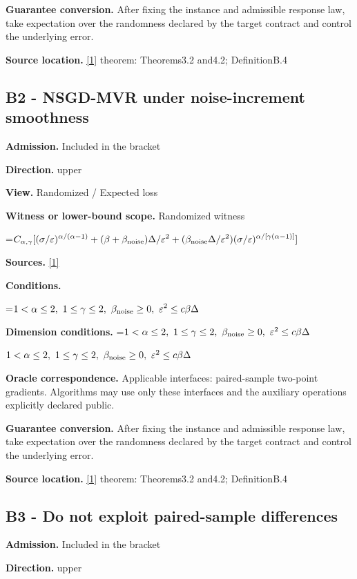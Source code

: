 \documentclass[10pt,a4paper]{article}
\newcommand{\AtlasMath}[1]{\par\begingroup\centering\setbox0=\hbox{$\displaystyle #1$}\ifdim\wd0>1.4\linewidth\typeout{ATLAS WIDE FORMULA: \the\wd0}\fi\ifdim\wd0>\linewidth\resizebox{\linewidth}{!}{\box0}\else\box0\fi\par\endgroup}
\newcommand{\AtlasInlineMath}[1]{\begingroup\setbox0=\hbox{$#1$}\ifdim\wd0>.4\linewidth\endgroup\AtlasMath{#1}\else\endgroup$#1$\fi}
\begin{document}
\textbf{Guarantee conversion.} After fixing the instance and admissible response law, take expectation over the randomness declared by the target contract and control the underlying error.

\textbf{Source location.} \href{https://arxiv.org/pdf/2512.18713}{[1]} theorem: Theorems3.2 and4.2; DefinitionB.4

\subsection{B2 - NSGD-MVR under noise-increment smoothness}
\textbf{Admission.} Included in the bracket

\textbf{Direction.} upper

\textbf{View.} Randomized / Expected loss

\textbf{Witness or lower-bound scope.} Randomized witness

\AtlasMath{C_{\alpha,\gamma}[(\sigma/\varepsilon)^{\alpha/(\alpha-1)}+(\beta+\beta_{\rm noise})\Delta/\varepsilon^2+(\beta_{\rm noise}\Delta/\varepsilon^2)(\sigma/\varepsilon)^{\alpha/[\gamma(\alpha-1)]}]}
\textbf{Sources.} \href{https://arxiv.org/pdf/2512.18713}{[1]}

\textbf{Conditions.} 
\AtlasMath{1<\alpha\le2,\ 1\le\gamma\le2,\ \beta_{\rm noise}\ge0,\ \varepsilon^2\le c\beta\Delta}


\textbf{Dimension conditions.} \AtlasInlineMath{1<\alpha\le2,\ 1\le\gamma\le2,\ \beta_{\rm noise}\ge0,\ \varepsilon^2\le c\beta\Delta}

\textbf{Oracle correspondence.} Applicable interfaces: paired-sample two-point gradients. Algorithms may use only these interfaces and the auxiliary operations explicitly declared public.

\textbf{Guarantee conversion.} After fixing the instance and admissible response law, take expectation over the randomness declared by the target contract and control the underlying error.

\textbf{Source location.} \href{https://arxiv.org/pdf/2512.18713}{[1]} theorem: Theorems3.2 and4.2; DefinitionB.4

\subsection{B3 - Do not exploit paired-sample differences}
\textbf{Admission.} Included in the bracket

\textbf{Direction.} upper
\end{document}
